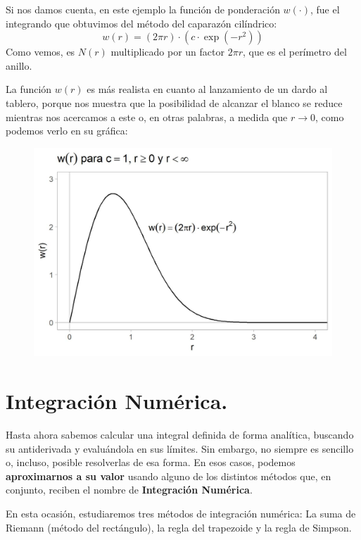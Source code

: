 \documentclass[12pt]{article}
\begin{document}
Si nos damos cuenta, en este ejemplo la función de ponderación $w(\cdot)$, fue el integrando que obtuvimos del método del caparazón cilíndrico:
\[
  w(r) = (2 \pi r) \cdot (c \cdot \exp(-r^{2}))
\]
Como vemos, es $N(r)$ multiplicado por un factor $2 \pi r$, que es el perímetro del anillo.

La función $w(r)$ es más realista en cuanto al lanzamiento de un dardo al tablero, porque nos muestra que la posibilidad de alcanzar el blanco se reduce mientras nos acercamos a este o, en otras palabras, a medida que $r \to 0$, como podemos verlo en su gráfica:

\newpage

\begin{figure}[hbt!]
\centering
\includegraphics[scale=0.8]{img/darts-prob-example-6.jpg}
\end{figure}


\section{Integración Numérica.}

Hasta ahora sabemos calcular una integral definida de forma analítica, buscando su antiderivada y evaluándola en sus límites. Sin embargo, no siempre es sencillo o, incluso, posible resolverlas de esa forma. En esos casos, podemos \textbf{aproximarnos a su valor} usando alguno de los distintos métodos que, en conjunto, reciben el nombre de \textbf{Integración Numérica}.

En esta ocasión, estudiaremos tres métodos de integración numérica: La suma de Riemann (método del rectángulo), la regla del trapezoide y la regla de Simpson.
\end{document}
